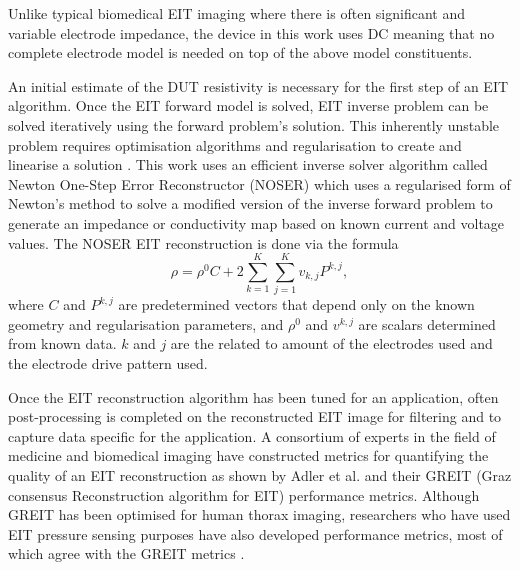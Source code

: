 Unlike typical biomedical EIT imaging where there is often significant and variable electrode impedance, the device in this work uses DC meaning that no complete electrode model is needed on top of the above model constituents.

An initial estimate of the DUT resistivity is necessary for the first step of an EIT algorithm. Once the EIT forward model is solved, EIT inverse problem can be solved iteratively using the forward problem's solution. This inherently unstable problem requires optimisation algorithms and regularisation to create and linearise a solution \citep{Bayford2018,Lionheart2003,Martins2019,Adler2021}. This work uses an efficient inverse solver algorithm called Newton One-Step Error Reconstructor (NOSER) which uses a regularised form of Newton's method to solve a modified version of the inverse forward problem to generate an impedance or conductivity map based on known current and voltage values\cite{Cheney1999}. The NOSER EIT reconstruction is done via the formula
\begin{equation}
	\rho = \rho^0 C + 2 \sum_{k=1}^{K}\sum_{j=1}^{K} v_{k,j} P^{k,j},
\end{equation}
where $C$ and $P^{k,j}$ are predetermined vectors that depend only on the known geometry and regularisation parameters, and $\rho^0$ and $v^{k,j}$ are scalars determined from known data. $k$ and $j$ are the related to amount of the electrodes used and the electrode drive pattern used.

Once the EIT reconstruction algorithm has been tuned for an application, often post-processing is completed on the reconstructed EIT image for filtering and to capture data specific for the application. A consortium of experts in the field of medicine and biomedical imaging  have constructed metrics for quantifying the quality of an EIT reconstruction as shown by Adler et al. \citep{Adler2009} and their GREIT (Graz consensus Reconstruction algorithm for EIT) performance metrics. Although GREIT has been optimised for human thorax imaging, researchers who have used EIT pressure sensing purposes have also developed performance metrics, most of which agree with the GREIT metrics \citep{Silvera-Tawil2015,Visentin2016,Tallman2020,Sun2020,Hassan2009,Kato2007b}.



